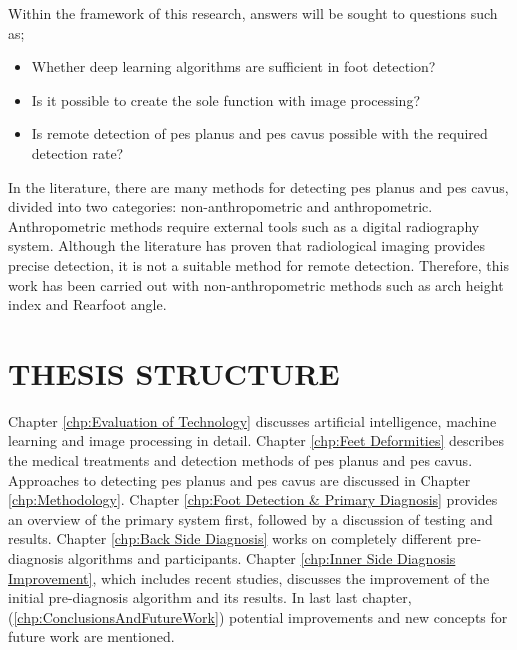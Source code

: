 Within the framework of this research, answers will be sought to questions such as;

\begin{itemize}
  \item Whether deep learning algorithms are sufficient in foot detection?
  \item Is it possible to create the sole function with image processing?
  \item Is remote detection of pes planus and pes cavus possible with the required detection rate?
\end{itemize}

In the literature, there are many methods for detecting pes planus and pes cavus, divided into two categories: non-anthropometric and anthropometric. Anthropometric methods require external tools such as a digital radiography system. Although the literature has proven that radiological imaging provides precise detection, it is not a suitable method for remote detection. Therefore, this work has been carried out with non-anthropometric methods such as arch height index and Rearfoot angle.

\section{THESIS STRUCTURE}

Chapter \ref{chp:Evaluation of Technology} discusses artificial intelligence, machine learning and image processing in detail. Chapter \ref{chp:Feet Deformities} describes the medical treatments and detection methods of pes planus and pes cavus. Approaches to detecting pes planus and pes cavus are discussed in Chapter \ref{chp:Methodology}. Chapter \ref{chp:Foot Detection & Primary Diagnosis} provides an overview of the primary system first, followed by a discussion of testing and results. Chapter \ref{chp:Back Side Diagnosis} works on completely different pre-diagnosis algorithms and participants. Chapter \ref{chp:Inner Side Diagnosis Improvement}, which includes recent studies, discusses the improvement of the initial pre-diagnosis algorithm and its results. In last last chapter, (\ref{chp:ConclusionsAndFutureWork}) potential improvements and new concepts for future work are mentioned.
